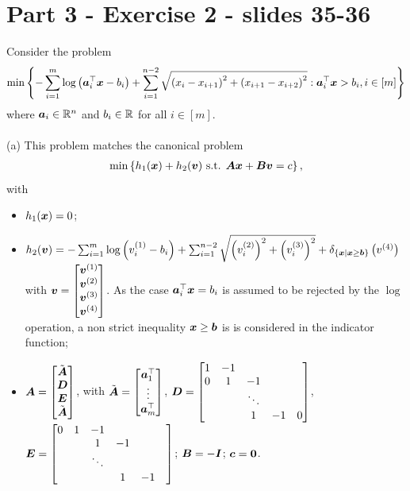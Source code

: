 \section{Part 3 - Exercise 2 - slides 35-36}
Consider the problem
\begin{align*}
	\min \left\{-\sum_{i=1}^m\log\left(\boldsymbol a_i^\top \boldsymbol x - 
  b_i\right)+ \sum_{i=1}^{n-2} \sqrt{\left(x_i-x_{i+1}\right)^2 + 
  \left(x_{i+1}-x_{i+2}\right)^2}: \boldsymbol a_i^\top \boldsymbol x > b_i, i
  \in [m] \right\}
\end{align*}
%
where $\boldsymbol a_i \in \mathbb{R}^n$ and $b_i \in \mathbb{R}$ for all $i\in [m]$. \\
%
\\
\indent (a) This problem matches the canonical problem 
\begin{align*}
	\min \left\{h_1(\boldsymbol x) + h_2(\boldsymbol v) \text{ s.t. }  \boldsymbol{Ax}+ \boldsymbol{Bv} = c \right\},
\end{align*}
with
\begin{itemize}
	\item $h_1(\boldsymbol x)=0$;
	\item $h_2(\boldsymbol v) = -\sum_{i=1}^m\log\left( v_i^{(1)} - b_i\right)+ \sum_{i=1}^{n-2} \sqrt{\left(v_i^{(2)}\right)^2+\left(v_i^{(3)}\right)^2}+ \delta_{\left\{\boldsymbol x|\boldsymbol x \geq \boldsymbol b\right\}}\left(v^{(4)}\right)$ with $\boldsymbol v = \begin{bmatrix}
		\boldsymbol v^{(1)} \\ \boldsymbol v^{(2)} \\ \boldsymbol v^{(3)} \\ \boldsymbol v^{(4)}
	\end{bmatrix}$. As the case $\boldsymbol a_i^\top \boldsymbol x=b_i$ is 
  assumed to be rejected by the $\log$ operation, a
  non strict inequality $\boldsymbol x\ge \boldsymbol b$ is 
  is considered in the indicator function;
	\item $\boldsymbol A = \begin{bmatrix}
		\Tilde{\boldsymbol  A} \\ \boldsymbol D \\ \boldsymbol E \\  \Tilde{\boldsymbol A} 
	\end{bmatrix}$, with $\Tilde{\boldsymbol A} = \begin{bmatrix}
		\boldsymbol a_1^\top \\ \vdots \\ \boldsymbol a_m^\top
	\end{bmatrix}$, $\boldsymbol D = \begin{bmatrix}
		1 & -1 &&& \\ 0 &1 &-1 && \\ && \ddots && \\ &&1&-1&0
	\end{bmatrix}$, $\boldsymbol E = \begin{bmatrix}
		0 &1 & -1 && \\ & &1 &-1 && \\ && \ddots && \\ &&&1&-1
	\end{bmatrix}$; $\boldsymbol B = -\boldsymbol I$; $\boldsymbol c = \boldsymbol 0$. 
\end{itemize}

